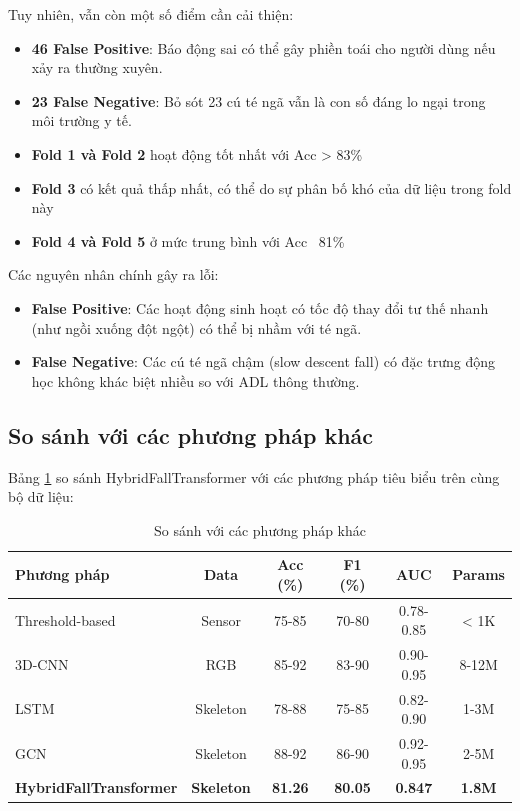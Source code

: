 Tuy nhiên, vẫn còn một số điểm cần cải thiện:
\begin{itemize}
    \item \textbf{46 False Positive}: Báo động sai có thể gây phiền toái cho người dùng nếu xảy ra thường xuyên.
    \item \textbf{23 False Negative}: Bỏ sót 23 cú té ngã vẫn là con số đáng lo ngại trong môi trường y tế.
\end{itemize}

\begin{itemize}
    \item \textbf{Fold 1 và Fold 2} hoạt động tốt nhất với Acc > 83\%
    \item \textbf{Fold 3} có kết quả thấp nhất, có thể do sự phân bố khó của dữ liệu trong fold này
    \item \textbf{Fold 4 và Fold 5} ở mức trung bình với Acc ~81\%
\end{itemize}

Các nguyên nhân chính gây ra lỗi:

\begin{itemize}
    \item \textbf{False Positive}: Các hoạt động sinh hoạt có tốc độ thay đổi tư thế nhanh (như ngồi xuống đột ngột) có thể bị nhầm với té ngã.
    \item \textbf{False Negative}: Các cú té ngã chậm (slow descent fall) có đặc trưng động học không khác biệt nhiều so với ADL thông thường.
\end{itemize}

\subsection{So sánh với các phương pháp khác}
\label{sec:comparison}

Bảng \ref{tab:method_comparison} so sánh HybridFallTransformer với các phương pháp tiêu biểu trên cùng bộ dữ liệu:

\begin{table}[h]
\centering
\caption{So sánh với các phương pháp khác}
\label{tab:method_comparison}
\begin{tabular}{|l|c|c|c|c|c|}
\hline
\textbf{Phương pháp} & \textbf{Data} & \textbf{Acc (\%)} & \textbf{F1 (\%)} & \textbf{AUC} & \textbf{Params} \\
\hline
Threshold-based \cite{} & Sensor & 75-85 & 70-80 & 0.78-0.85 & < 1K \\
\hline
3D-CNN \cite{} & RGB & 85-92 & 83-90 & 0.90-0.95 & 8-12M \\
\hline
LSTM \cite{} & Skeleton & 78-88 & 75-85 & 0.82-0.90 & 1-3M \\
\hline
GCN \cite{khani2024skeleton} & Skeleton & 88-92 & 86-90 & 0.92-0.95 & 2-5M \\
\hline
\textbf{HybridFallTransformer} & \textbf{Skeleton} & \textbf{81.26} & \textbf{80.05} & \textbf{0.847} & \textbf{1.8M} \\
\hline
\end{tabular}
\end{table}

